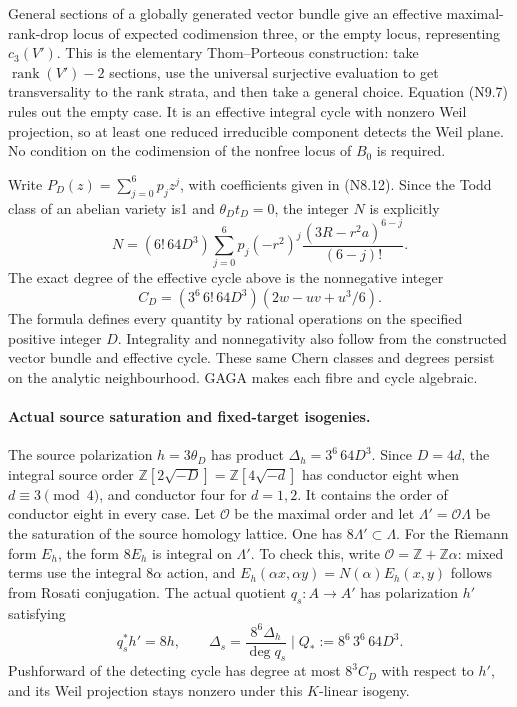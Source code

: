 General sections of a globally generated vector bundle give
an effective maximal-rank-drop locus of expected codimension
three, or the empty locus, representing $c_3(V')$. This is the
elementary Thom--Porteous construction: take
$\operatorname{rank}(V')-2$ sections, use the universal surjective
evaluation to get transversality to the rank strata, and then
take a general choice. Equation (N9.7) rules out the empty case.
It is an effective integral cycle with nonzero Weil projection,
so at least one reduced irreducible component detects the Weil
plane. No condition on the codimension of the nonfree locus of
$B_0$ is required.

Write $P_D(z)=\sum_{j=0}^6p_jz^j$, with coefficients given in
(N8.12). Since the Todd class of an abelian variety is1 and
$\theta_Dt_D=0$, the integer $N$ is explicitly
\[
 N=(6!\,64D^3)\sum_{j=0}^6
       p_j(-r^2)^j\frac{(3R-r^2a)^{6-j}}{(6-j)!}.
\]
The exact degree of the effective cycle above is the nonnegative
integer
\[
 C_D=(3^6\,6!\,64D^3)(2w-uv+u^3/6).                     \tag{N9.8}
\]
The formula defines every quantity by rational operations on
the specified positive integer $D$. Integrality and nonnegativity
also follow from the constructed vector bundle and effective
cycle. These same Chern classes and degrees persist on the
analytic neighbourhood. GAGA makes each fibre and cycle algebraic.

\paragraph{Actual source saturation and fixed-target isogenies.}
The source polarization $h=3\theta_D$ has product
$\Delta_h=3^6\,64D^3$. Since $D=4d$, the integral source order
$\mathbb Z[2\sqrt{-D}]=\mathbb Z[4\sqrt{-d}]$ has conductor
eight when $d\equiv3\pmod4$, and conductor four for $d=1,2$.
It contains the order of conductor eight in every case.
Let $\mathcal O$ be the maximal order and let
$\Lambda'=\mathcal O\Lambda$ be the saturation of the source
homology lattice. One has $8\Lambda'\subset\Lambda$.
For the Riemann form $E_h$, the form $8E_h$ is integral on
$\Lambda'$. To check this, write
$\mathcal O=\mathbb Z+\mathbb Z\alpha$: mixed terms use the
integral $8\alpha$ action, and
$E_h(\alpha x,\alpha y)=N(\alpha)E_h(x,y)$ follows from
Rosati conjugation. The actual quotient $q_s:A\to A'$ has
polarization $h'$ satisfying
\[
 q_s^*h'=8h,\qquad
 \Delta_s=\frac{8^6\Delta_h}{\deg q_s}
       \mid Q_*:=8^6\,3^6\,64D^3.
\]
Pushforward of the detecting cycle has degree at most $8^3C_D$
with respect to $h'$, and its Weil projection stays nonzero
under this $K$-linear isogeny.

